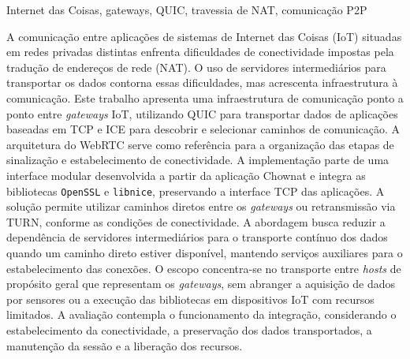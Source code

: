 \documentclass[portuguese, oneside]{pucrs-ppgcc}
\begin{document}
\begin{resumo}{Internet das Coisas, gateways, QUIC, travessia de NAT, comunicação P2P}

A comunicação entre aplicações de sistemas de Internet das Coisas (IoT) situadas em redes privadas distintas enfrenta dificuldades de conectividade impostas pela tradução de endereços de rede (NAT). O uso de servidores intermediários para transportar os dados contorna essas dificuldades, mas acrescenta infraestrutura à comunicação. Este trabalho apresenta uma infraestrutura de comunicação ponto a ponto entre \textit{gateways} IoT, utilizando QUIC para transportar dados de aplicações baseadas em TCP e ICE para descobrir e selecionar caminhos de comunicação. A arquitetura do WebRTC serve como referência para a organização das etapas de sinalização e estabelecimento de conectividade. A implementação parte de uma interface modular desenvolvida a partir da aplicação Chownat e integra as bibliotecas \texttt{OpenSSL} e \texttt{libnice}, preservando a interface TCP das aplicações. A solução permite utilizar caminhos diretos entre os \textit{gateways} ou retransmissão via TURN, conforme as condições de conectividade. A abordagem busca reduzir a dependência de servidores intermediários para o transporte contínuo dos dados quando um caminho direto estiver disponível, mantendo serviços auxiliares para o estabelecimento das conexões. O escopo concentra-se no transporte entre \textit{hosts} de propósito geral que representam os \textit{gateways}, sem abranger a aquisição de dados por sensores ou a execução das bibliotecas em dispositivos IoT com recursos limitados. A avaliação contempla o funcionamento da integração, considerando o estabelecimento da conectividade, a preservação dos dados transportados, a manutenção da sessão e a liberação dos recursos.


\end{resumo}
\end{document}
